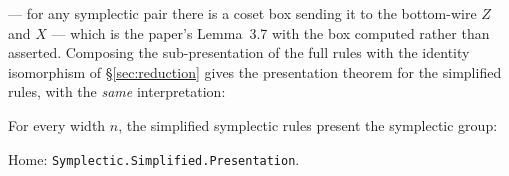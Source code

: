 \begingroup\renewcommand{\AgdaCodeStyle}{\footnotesize}
\begin{code}%
\>[0]\AgdaSpace{}%
\AgdaSymbol{:}\AgdaSpace{}%
\AgdaSpace{}%
\AgdaSymbol{\{}\AgdaSymbol{\}}\AgdaSpace{}%
\AgdaSymbol{(}\AgdaSpace{}%
\AgdaSpace{}%
\AgdaSymbol{:}\AgdaSpace{}%
\AgdaSpace{}%
\AgdaSymbol{)}\AgdaSpace{}%
\AgdaSpace{}%
\AgdaSpace{}%
\AgdaSpace{}%
\AgdaSpace{}%
\AgdaSpace{}%
\AgdaSpace{}%
\AgdaSpace{}%
\AgdaSpace{}%
\AgdaSpace{}%
\AgdaSymbol{(}\AgdaSpace{}%
\AgdaSymbol{:}\AgdaSpace{}%
\AgdaSpace{}%
\AgdaSymbol{)}\AgdaSpace{}%
\AgdaSpace{}%
\AgdaSpace{}%
\AgdaOperator{\AgdaPostulate{[}}\AgdaSpace{}%
\AgdaSpace{}%
\AgdaOperator{\AgdaPostulate{]ᵐˡ}}\AgdaSpace{}%
\AgdaSpace{}%
\AgdaSpace{}%
\AgdaSpace{}%
\AgdaSpace{}%
\AgdaSpace{}%
\AgdaOperator{\AgdaPostulate{[}}\AgdaSpace{}%
\AgdaSpace{}%
\AgdaOperator{\AgdaPostulate{]ᵐˡ}}\AgdaSpace{}%
\AgdaSpace{}%
\AgdaSpace{}%
\<%
\end{code}
\endgroup
\begin{code}[hide]%
\>[0]\AgdaSpace{}%
\AgdaSymbol{=}\AgdaSpace{}%
\<%
\end{code}

--- for any symplectic pair there is a coset box sending it to the
bottom-wire $Z$ and $X$ --- which is the paper's Lemma~3.7 with the box
computed rather than asserted.  Composing the sub-presentation of the
full rules with the identity isomorphism of \S\ref{sec:reduction} gives
the presentation theorem for the simplified rules, with the \emph{same}
interpretation:

\begin{theorem}\label{thm:sp}
For every width $n$, the simplified symplectic rules present the
symplectic group:
\begin{code}%
\>[0]\AgdaSpace{}%
\AgdaSymbol{:}\AgdaSpace{}%
\AgdaSpace{}%
\AgdaSpace{}%
\AgdaSpace{}%
\AgdaSymbol{(}\AgdaSpace{}%
\AgdaSymbol{)}\AgdaSpace{}%
\AgdaSpace{}%
\AgdaSymbol{(}\AgdaSpace{}%
\AgdaSymbol{)}\<%
\end{code}
\begin{code}[hide]%
\>[0]\AgdaSpace{}%
\AgdaSpace{}%
\AgdaSymbol{=}\AgdaSpace{}%
\AgdaSpace{}%
\AgdaSymbol{\{}\AgdaSymbol{\}}\<%
\end{code}
\noindent Home: \texttt{Symplectic.Simplified.Presentation}.
\end{theorem}

